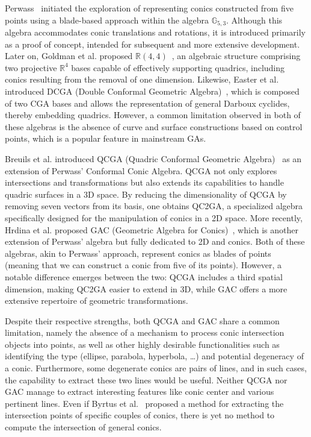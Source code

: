 \documentclass{birkjour}
\begin{document}
Perwass~\cite{perwass_geometric_2009} initiated the exploration of representing conics constructed from five points using a blade-based approach within the algebra \(\mathbb{G}_{5,3}\). Although this algebra accommodates conic translations and rotations, it is introduced primarily as a proof of concept, intended for subsequent and more extensive development. Later on, Goldman et al. proposed \(\mathbb{R}(4,4)\)~\cite{goldman_r4_2015}, an algebraic structure comprising two projective \(\mathbb{R}^4\) bases capable of effectively supporting quadrics, including conics resulting from the removal of one dimension. Likewise, Easter et al. introduced DCGA (Double Conformal Geometric Algebra)~\cite{easter_double_2017}, which is composed of two CGA bases and allows the representation of general Darboux cyclides, thereby embedding quadrics. However, a common limitation observed in both of these algebras is the absence of curve and surface constructions based on control points, which is a popular feature in mainstream GAs.

Breuils et al. introduced QCGA (Quadric Conformal Geometric Algebra)~\cite{breuils2018quadric,breuils_three-dimensional_2019} as an extension of Perwass' Conformal Conic Algebra. QCGA not only explores intersections and transformations but also extends its capabilities to handle quadric surfaces in a 3D space. By reducing the dimensionality of QCGA by removing seven vectors from its basis, one obtains QC2GA, a specialized algebra specifically designed for the manipulation of conics in a 2D space. More recently, Hrdina et al. proposed GAC (Geometric Algebra for Conics)~\cite{hrdina_geometric_2018}, which is another extension of Perwass' algebra but fully dedicated to 2D and conics. Both of these algebras, akin to Perwass' approach, represent conics as blades of points (meaning that we can construct a conic from five of its points). However, a notable difference emerges between the two: QCGA includes a third spatial dimension, making QC2GA easier to extend in 3D, while GAC offers a more extensive repertoire of geometric transformations.

Despite their respective strengths, both QCGA and GAC share a common limitation, namely the absence of a mechanism to process conic intersection objects into points, as well as other highly desirable functionalities such as identifying the type (ellipse, parabola, hyperbola, \dots) and potential degeneracy of a conic. Furthermore, some degenerate conics are pairs of lines, and in such cases, the capability to extract these two lines would be useful. Neither QCGA nor GAC manage to extract interesting features like conic center and various pertinent lines. Even if Byrtus et al.~\cite{byrtus_specific_2021} proposed a method for extracting the intersection points of specific couples of conics, there is yet no method to compute the intersection of general conics.
\end{document}
